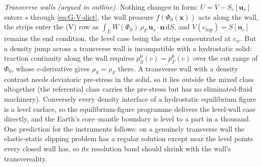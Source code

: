 \documentclass[11pt]{article}
\newcommand{\bu}{\mathbf{u}}
\newcommand{\bn}{\mathbf{n}}
\newcommand{\dS}{\,\mathrm{d}S}
\begin{document}
\emph{Transverse walls (argued in outline).} Nothing changes in form:
$U = V - S_c[\bu_s]$ enters $s$ through \eqref{eq:G-V-dict}, the wall
pressure $f(\Phi_0(\mathbf x))$ acts along the wall, the strips enter
the (V) row as $\int_\Sigma W(\Phi_0)\,\rho_F\,\bu_s\cdot\bn\dS$, and
$V(c_{\mathrm{top}}) = S[\bu_s]$ remains the end condition, the level
case being the strips concentrated at $c_w$. But a density jump across
a transverse wall is incompatible with a hydrostatic solid: traction
continuity along the wall requires $p^0_S(c) = p^0_F(c)$ over the cut
range of $\Phi_0$, whose $c$-derivative gives $\rho_S = \rho_F$ there.
A transverse wall with a density contrast needs deviatoric pre-stress
in the solid, so it lies outside the mixed class altogether (the
referential class carries the pre-stress but has no eliminated-fluid
machinery). Conversely every density interface of a hydrostatic
equilibrium figure is a level surface, so the equilibrium-figure
programme delivers the level-wall case directly, and the Earth's
core--mantle boundary is level to a part in a thousand. One prediction
for the instruments follows: on a genuinely transverse wall the
elastic-static slipping problem has a regular solution except near the
level points every closed wall has, so its resolution band should
shrink with the wall's transversality.
\end{document}
